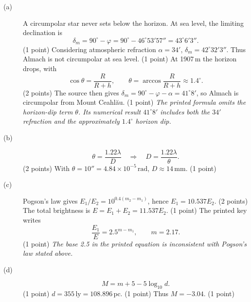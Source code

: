 \begin{description}
\item[(a)] A circumpolar star never sets below the horizon. At sea level, the limiting declination is
\[
\delta_m=90^\circ-\varphi=90^\circ-46^\circ53'57''=43^\circ6'3''.
\]\hfill(1 point)
Considering atmospheric refraction $\alpha=34'$, $\delta_m=42^\circ32'3''$. Thus Almach is not circumpolar at sea level. \hfill(1 point)
At 1907\,m the horizon drops, with
\[
\cos\theta=\frac{R}{R+h},\qquad \theta=\arccos\frac{R}{R+h}\approx1.4^\circ.
\]\hfill(2 points)
The source then gives $\delta_m=90^\circ-\varphi-\alpha=41^\circ8'$, so Almach is circumpolar from Mount Ceahl\u{a}u. \hfill(1 point)
\textit{The printed formula omits the horizon-dip term $\theta$. Its numerical result $41^\circ8'$ includes both the $34'$ refraction and the approximately $1.4^\circ$ horizon dip.}
\item[(b)]
\[
\theta=\frac{1.22\lambda}{D}\quad\Rightarrow\quad D=\frac{1.22\lambda}{\theta}.
\]\hfill(2 points)
With $\theta=10''=4.84\times10^{-5}\,\mathrm{rad}$, $D\approx14\,\mathrm{mm}$. \hfill(1 point)
\item[(c)] Pogson's law gives $E_1/E_2=10^{0.4(m_2-m_1)}$, hence $E_1=10.537E_2$. \hfill(2 points)
The total brightness is $E=E_1+E_2=11.537E_2$. \hfill(1 point)
The printed key writes
\[
\frac{E_1}{E}=2.5^{m-m_1},\qquad m=2.17.
\]\hfill(1 point)
\textit{The base 2.5 in the printed equation is inconsistent with Pogson's law stated above.}
\item[(d)]
\[
M=m+5-5\log_{10}d.
\]\hfill(1 point)
$d=355\,\mathrm{ly}=108.896\,\mathrm{pc}$. \hfill(1 point)
Thus $M=-3.04$. \hfill(1 point)
\end{description}
